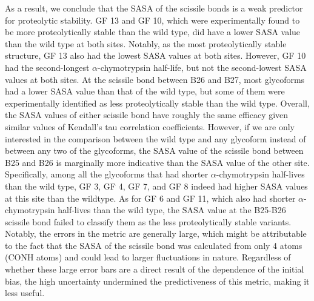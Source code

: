 \documentclass[sn-vancouver]{sn-jnl}
\begin{document}
As a result, we conclude that the SASA of the scissile bonds is a weak predictor for proteolytic stability. GF 13 and GF 10, which were experimentally found to be more proteolytically stable than the wild type, did have a lower SASA value than the wild type at both sites. Notably, as the most proteolytically stable structure, GF 13 also had the lowest SASA values at both sites. However, GF 10 had the second-longest $\alpha$-chymotrypsin half-life, but not the second-lowest SASA values at both sites. At the scissile bond between B26 and B27, most glycoforms had a lower SASA value than that of the wild type, but some of them were experimentally identified as less proteolytically stable than the wild type. Overall, the SASA values of either scissile bond have roughly the same efficacy given similar values of Kendall’s tau correlation coefficients. However, if we are only interested in the comparison between the wild type and any glycoform instead of between any two of the glycoforms, the SASA value of the scissile bond between B25 and B26 is marginally more indicative than the SASA value of the other site. Specifically, among all the glycoforms that had shorter $\alpha$-chymotrypsin half-lives than the wild type, GF 3, GF 4, GF 7, and GF 8 indeed had higher SASA values at this site than the wildtype. As for GF 6 and GF 11, which also had shorter $\alpha$-chymotrypsin half-lives than the wild type, the SASA value at the B25-B26 scissile bond failed to classify them as the less proteolytically stable variants. Notably, the errors in the metric are generally large, which might be attributable to the fact that the SASA of the scissile bond was calculated from only 4 atoms (CONH atoms) and could lead to larger fluctuations in nature. Regardless of whether these large error bars are a direct result of the dependence of the initial bias, the high uncertainty undermined the predictiveness of this metric, making it less useful.
\end{document}
